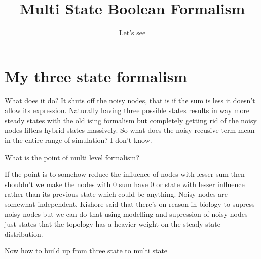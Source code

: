 \documentclass{article}
\title{Multi State Boolean Formalism}
\author{Let's see}
\begin{document}
\maketitle

\section{My three state formalism }
What does it do? It shuts off the noisy nodes, that is if the sum is less it doesn't allow its expression. Naturally having three possible states results in way more steady states with the old ising formalism but completely getting rid of the noisy nodes filters hybrid states massively. So what does the noisy recusive term mean in the entire range of simulation? I don't know. 

What is the point of multi level formalism? 

If the point is to somehow reduce the influence of nodes with lesser sum then shouldn't we make the nodes with 0 sum have 0 or state with lesser influence rather than its previous state which could be anything. Noisy nodes are somewhat independent. Kishore said that there's on reason in biology to supress noisy nodes but we can do that using modelling and supression of noisy nodes just states that the topology has a heavier weight on the steady state distribution. 


Now how to build up from three state to multi state 
\end{document}
